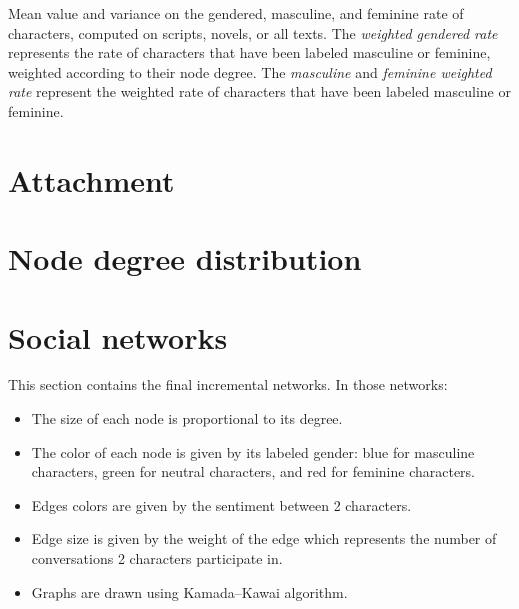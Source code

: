 \documentclass[a4paper, 12pt]{report}
\begin{document}
\begin{appendices}
\begin{table}[]
\caption{Mean value and variance on the gendered, masculine, and feminine rate of characters, computed on scripts, novels, or all texts. The \textit{weighted gendered rate} represents the rate of characters that have been labeled masculine or feminine, weighted according to their node degree. The \textit{masculine} and \textit{feminine weighted rate} represent the weighted rate of characters that have been labeled masculine or feminine. }
\label{gender_all_weighted}
\end{table}












\chapter{Attachment}
\label{ref_attachement}





\chapter{Node degree distribution}
\label{a_degree}







\chapter{Social networks}
This section contains the final incremental networks. In those networks:
\begin{itemize}
\item The size of each node is proportional to its degree.
\item The color of each node is given by its labeled gender: blue for masculine characters, green for neutral characters, and red for feminine characters.
\item Edges colors are given by the sentiment between 2 characters.
\item Edge size is given by the weight of the edge which represents the number of conversations 2 characters participate in.
\item Graphs are drawn using Kamada–Kawai algorithm.
\end{itemize}
\label{final_sn}



\end{appendices}
\end{document}
